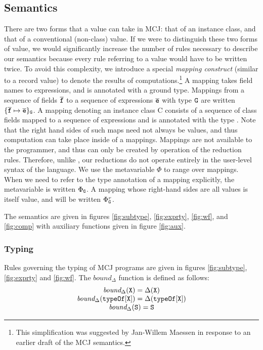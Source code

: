 \documentclass{acm-sigplan}
\begin{document}
\subsection{Semantics}
\label{formalsem}

There are two forms that a value can take in MCJ: that of an instance
class, and that of a conventional (non-class) value. If we were to
distinguish these two forms of value, we would significantly increase
the number of rules necessary to describe our semantics because every
rule referring to a value would have to be written twice. To avoid
this complexity, we introduce a special {\em mapping construct}
(similar to a record value) to denote the results of
computations.\footnote{This simplification was suggested by Jan-Willem
Maessen in response to an earlier draft of the MCJ semantics.}  A
mapping takes field names to expressions, and is annotated with a
ground type. Mappings from a sequence of fields ${\overline{{\mbox {\tt f}}}}$ to a sequence of
expressions ${\overline{{\mbox {\tt e}}}}$ with type $\mathtt{{G}}$ are written $\{{{\overline{{\mbox {\tt f}}}}} \mapsto {\ensuremath {{\overline{{\mbox {\tt e}}}}}}\}_{\mathtt{{G}}}$.
A mapping denoting an instance class {\txt C} consists of a sequence
of class fields mapped to a sequence of expressions and is annotated
with the type \typeof{\C}. Note that the right hand sides of such
maps need not always be values, and thus computation can take place
inside of a mappings.  Mappings are not available to the programmer,
and thus can only be created by operation of the reduction rules.
Therefore, unlike \FJ, our reductions do not operate entirely in the
user-level syntax of the language.  We use the metavariable $\Phi$ to
range over mappings.  When we need to refer to the type annotation of
a mapping explicitly, the metavariable is written $\Phi_{\mathtt{{G}}}$.  A
mapping whose right-hand sides are all values is itself value, and
will be written $\Phi_{\mathtt{{G}}}^v$.  

The semantics are given in figures \ref{fig:subtype},
\ref{fig:exprty}, \ref{fig:wf}, and \ref{fig:comp} with auxiliary
functions given in figure \ref{fig:aux}.


\subsubsection{Typing}
Rules governing the typing of MCJ programs are given in figures
\ref{fig:subtype}, \ref{fig:exprty} and \ref{fig:wf}.  The
$bound_{\Delta}$ function is defined as follows:
\begin{displaymath}
\begin{array}{c}
\mbox{\it bound}_{\Delta}(\mbox {\tt X}) = \Delta(\mbox {\tt X}) \\
\mbox{\it bound}_{\Delta}({\mathtt{{typeOf}}\mathtt{{[}}\mbox {\tt X}\mathtt{{]}}}) = \Delta({\mathtt{{typeOf}}\mathtt{{[}}\mbox {\tt X}\mathtt{{]}}}) \\
\mbox{\it bound}_{\Delta}(\mbox {\tt S}) = \mbox {\tt S}
\end{array}
\end{displaymath}
\end{document}
